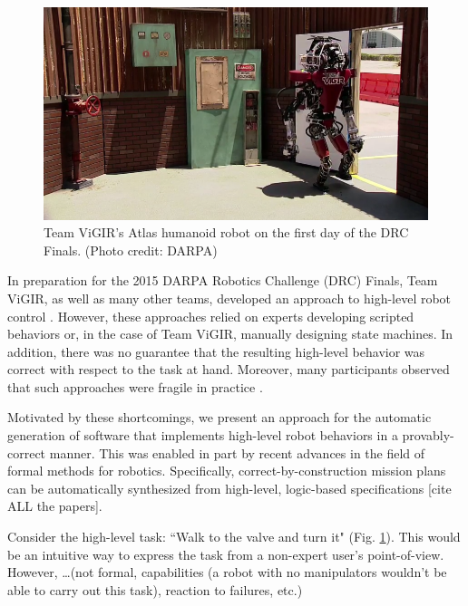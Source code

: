 
\begin{figure}[t]
\centering
\includegraphics[width=0.99\columnwidth,clip]{./img/atlas_door_finals.png}
\caption{Team ViGIR's Atlas humanoid robot on the first day of the DRC Finals. (Photo credit: DARPA)
}
\label{Fig:AtlasDoorFinals}
\end{figure}

In preparation for the 2015 DARPA Robotics Challenge (DRC) Finals, Team ViGIR, as well as many other teams, developed an approach to high-level robot control \cite{Philipp2013Bsc, Philipp2015Msc}.
However, these approaches relied on experts developing scripted behaviors or, in the case of Team ViGIR, manually designing state machines.
In addition, there was no guarantee that the resulting high-level behavior was correct with respect to the task at hand.
Moreover, many participants observed that such approaches were fragile in practice \cite{DRC-what-happened}.

Motivated by these shortcomings, we present an approach for the automatic generation of software that implements high-level robot behaviors in a provably-correct manner.
This was enabled in part by recent advances in the field of formal methods for robotics.
Specifically, correct-by-construction mission plans can be automatically synthesized from high-level, logic-based specifications [cite ALL the papers].

\begin{myExample}\label{Ex:PickupObject}
	Consider the high-level task: ``Walk to the valve and turn it" (Fig. \ref{Fig:AtlasDoorFinals}).
	This would be an intuitive way to express the task from a non-expert user's point-of-view.
	However, \ldots (not formal, capabilities (a robot with no manipulators wouldn't be able to carry out this task), reaction to failures, etc.)
\end{myExample}

